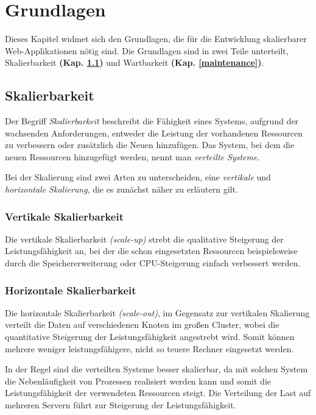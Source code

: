 \chapter{Grundlagen}

Dieses Kapitel widmet sich den Grundlagen, die für die Entwicklung skalierbarer Web-Applikationen nötig sind. Die Grundlagen sind in zwei Teile unterteilt, Skalierbarkeit \textbf{(Kap. \ref{scale})} und Wartbarkeit \textbf{(Kap. \ref{maintenance})}.

\section{Skalierbarkeit}\label{scale}

Der Begriff \textit{Skalierbarkeit} beschreibt die Fähigkeit eines Systems,  aufgrund der wachsenden Anforderungen, entweder die Leistung der vorhandenen Ressourcen zu verbessern oder zusätzlich die Neuen hinzufügen. Das System, bei dem die neuen Ressourcen hinzugefügt werden, nennt man \textit{verteilte Systeme}.

Bei der Skalierung sind zwei Arten zu unterscheiden, eine \textit{vertikale} und \textit{horizontale Skalierung}, die es zunächst näher zu erläutern gilt.

\subsection{Vertikale Skalierbarkeit}
Die vertikale Skalierbarkeit \textit{(scale-up)} strebt die qualitative Steigerung der Leistungsfähigkeit an, bei der die schon eingesetzten Ressourcen beispielsweise durch die Speichererweiterung oder CPU-Steigerung einfach verbessert werden.

\subsection{Horizontale Skalierbarkeit}
Die horizontale Skalierbarkeit \textit{(scale-out)}, im Gegensatz zur vertikalen Skalierung verteilt die Daten auf verschiedenen Knoten im großen Cluster, wobei die quantitative Steigerung der Leistungsfähigkeit angestrebt wird. Somit können mehrere weniger leistungsfähigere, nicht so teuere Rechner eingesetzt werden. %

In der Regel sind die verteilten Systeme besser skalierbar, da mit solchen System die Nebenläufigkeit von Prozessen realisiert werden kann und somit die Leistungsfähigkeit der verwendeten Ressourcen steigt. Die Verteilung der Last auf mehreren Servern führt zur Steigerung der Leistungsfähigkeit.

